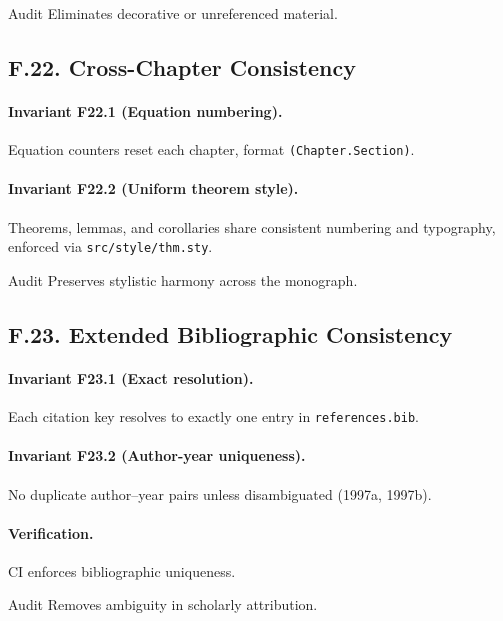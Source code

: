 \begin{auditblock}{Audit}
Eliminates decorative or unreferenced material.
\end{auditblock}

\subsection*{F.22. Cross-Chapter Consistency}

\paragraph{Invariant F22.1 (Equation numbering).}
Equation counters reset each chapter, format \texttt{(Chapter.Section)}.

\paragraph{Invariant F22.2 (Uniform theorem style).}
Theorems, lemmas, and corollaries share consistent numbering and
typography, enforced via \texttt{src/style/thm.sty}.

\begin{auditblock}{Audit}
Preserves stylistic harmony across the monograph.
\end{auditblock}

\subsection*{F.23. Extended Bibliographic Consistency}

\paragraph{Invariant F23.1 (Exact resolution).}
Each citation key resolves to exactly one entry in
\texttt{references.bib}.

\paragraph{Invariant F23.2 (Author-year uniqueness).}
No duplicate author–year pairs unless disambiguated (1997a, 1997b).

\paragraph{Verification.}
CI enforces bibliographic uniqueness.

\begin{auditblock}{Audit}
Removes ambiguity in scholarly attribution.
\end{auditblock}

